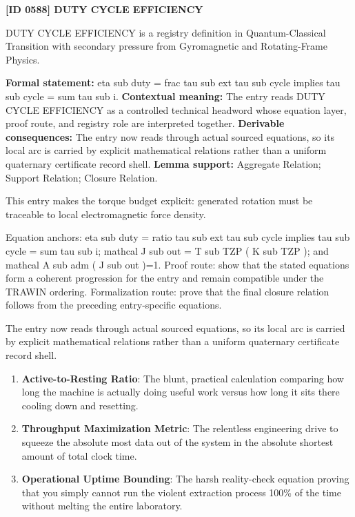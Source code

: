 \clearpage
\noindent\textbf{[ID 0588] DUTY CYCLE EFFICIENCY}\par
\vspace{0.35em}
\begingroup\small
{}
DUTY CYCLE EFFICIENCY is a registry definition in Quantum-Classical Transition with secondary pressure from Gyromagnetic and Rotating-Frame Physics.

\begingroup\footnotesize\setlength{\emergencystretch}{3em}\sloppy
\textbf{Formal statement:} eta sub duty = frac tau sub ext tau sub cycle implies tau sub cycle = sum tau sub i. \textbf{Contextual meaning:} The entry reads DUTY CYCLE EFFICIENCY as a controlled technical headword whose equation layer, proof route, and registry role are interpreted together. \textbf{Derivable consequences:} The entry now reads through actual sourced equations, so its local arc is carried by explicit mathematical relations rather than a uniform quaternary certificate record shell. \textbf{Lemma support:} Aggregate Relation; Support Relation; Closure Relation.\par
\endgroup

This entry makes the torque budget explicit: generated rotation must be traceable to local electromagnetic force density.

Equation anchors: eta sub duty = ratio tau sub ext tau sub cycle implies tau sub cycle = sum tau sub i; mathcal J sub out = T sub TZP ( K sub TZP ); and mathcal A sub adm ( J sub out )=1. Proof route: show that the stated equations form a coherent progression for the entry and remain compatible under the TRAWIN ordering. Formalization route: prove that the final closure relation follows from the preceding entry-specific equations.

The entry now reads through actual sourced equations, so its local arc is carried by explicit mathematical relations rather than a uniform quaternary certificate record shell.
\endgroup

\begin{enumerate}[leftmargin=1.6em,itemsep=6pt,topsep=4pt]
\item \textbf{Active-to-Resting Ratio}: The blunt, practical calculation comparing how long the machine is actually doing useful work versus how long it sits there cooling down and resetting.
\item \textbf{Throughput Maximization Metric}: The relentless engineering drive to squeeze the absolute most data out of the system in the absolute shortest amount of total clock time.
\item \textbf{Operational Uptime Bounding}: The harsh reality-check equation proving that you simply cannot run the violent extraction process 100\% of the time without melting the entire laboratory.
\end{enumerate}

